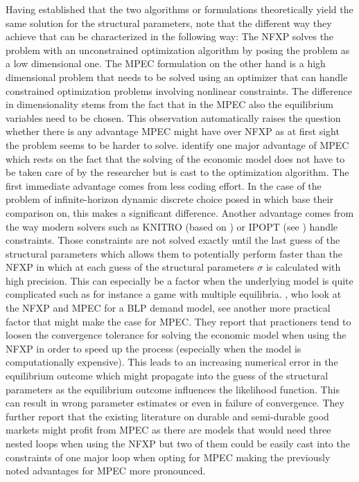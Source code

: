 Having established that the two algorithms or formulations theoretically yield the same solution for the structural parameters, \cite{Dong.Hsieh.Zhang.2017} note that the different way they achieve that can be characterized in the following way: The NFXP solves the problem with an unconstrained optimization algorithm by posing the problem as a low dimensional one. The MPEC formulation on the other hand is a high dimensional problem that needs to be solved using an optimizer that can handle constrained optimization problems involving nonlinear constraints. The difference in dimensionality stems from the fact that in the MPEC also the equilibrium variables need to be chosen. This observation automatically raises the question whether there is any advantage MPEC might have over NFXP as at first sight the problem seems to be harder to solve. \cite{Su.Judd.2012} identify one major advantage of MPEC which rests on the fact that the solving of the economic model does not have to be taken care of by the researcher but is cast to the optimization algorithm. The first immediate advantage comes from less coding effort. In the case of the problem of infinite-horizon dynamic discrete choice posed in \cite{Rust.1987} which \citeauthor{Su.Judd.2012} base their comparison on, this makes a significant difference. Another advantage comes from the way modern solvers such as KNITRO (based on \cite{Byrd.Nocedal.Waltz.2006}) or IPOPT (see \cite{Pirnay.Lopez-Negrete.Biegler.2011}) handle constraints. Those constraints are not solved exactly until the last guess of the structural parameters which allows them to potentially perform faster than the NFXP in which at each guess of the structural parameters $\sigma$ is calculated with high precision. This can especially be a factor when the underlying model is quite complicated such as for instance a game with multiple equilibria. \cite{Dube.Fox.Su.2012}, who look at the NFXP and MPEC for a BLP demand model, see another more practical factor that might make the case for MPEC. They report that practioners tend to loosen the convergence tolerance for solving the economic model when using the NFXP in order to speed up the process (especially when the model is computationally expensive). This leads to an increasing numerical error in the equilibrium outcome which might propagate into the guess of the structural parameters as the equilibrium outcome influences the likelihood function. This can result in wrong parameter estimates or even in failure of convergence. They further report that the existing literature on durable and semi-durable good markets might profit from MPEC as there are models that would need three nested loops when using the NFXP but two of them could be easily cast into the constraints of one major loop when opting for MPEC making the previously noted advantages for MPEC more pronounced.

